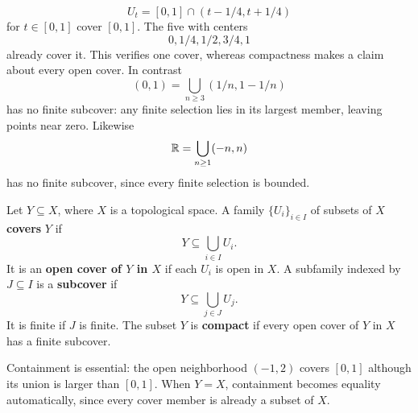 \[
U_t=[0,1]\cap(t-1/4,t+1/4)
\]
 for $t\in[0,1]$ cover $[0,1]$.
The five with centers
\[
0,1/4,1/2,3/4,1
\]
 already cover it. This verifies
one cover, whereas compactness makes a claim about every open cover.
In contrast
\[
(0,1)=\bigcup_{n\geq3}(1/n,1-1/n)
\]
 has no finite subcover:
any finite selection lies in its largest member, leaving points near zero.
Likewise
\[
\mathbb{R}=\bigcup_{n\geq1}(-n,n)
\]
 has no finite subcover, since every
finite selection is bounded.
\begin{definition}\label{def:compact-subset}
Let $Y\subseteq X$, where $X$ is a topological space. A family
$\{U_i\}_{i\in I}$ of subsets of $X$ \textbf{covers} $Y$ if
\[
Y\subseteq\bigcup_{i\in I}U_i.
\]
It is an \textbf{open cover of $Y$ in $X$} if each $U_i$ is open in $X$.
A subfamily indexed by $J\subseteq I$ is a \textbf{subcover} if
\[
Y\subseteq\bigcup_{j\in J}U_j.
\]
It is finite if $J$ is finite.
The subset $Y$ is \textbf{compact} if every open cover of $Y$ in $X$
has a finite subcover.
\end{definition}
Containment is essential: the open neighborhood $(-1,2)$ covers $[0,1]$
although its union is larger than $[0,1]$. When $Y=X$, containment becomes
equality automatically, since every cover member is already a subset of $X$.

